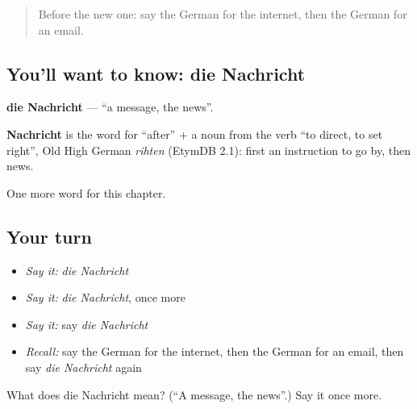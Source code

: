 \label{lesson:GE-C159-nachricht}



\begin{quote}
Before the new one: say the German for the internet, then the German for an email.
\end{quote}

\subsection*{You'll want to know: die Nachricht}
\textbf{die Nachricht} — \textquotedblleft{}a message, the news\textquotedblright{}.

\begin{cousinweb}
\textbf{Nachricht} is the word for \textquotedblleft{}after\textquotedblright{} + a noun from the verb \textquotedblleft{}to direct, to set right\textquotedblright{}, Old High German \emph{rihten} (EtymDB 2.1): first an instruction to go by, then news.
\end{cousinweb}

\begin{grammarlens}[title={What you've built}]
One more word for this chapter.
\end{grammarlens}

\subsection*{Your turn}
\begin{itemize}
\raggedright
  \item \emph{Say it:} \emph{die Nachricht}
  \item \emph{Say it:} \emph{die Nachricht}, once more
  \item \emph{Say it:} say \emph{die Nachricht}
  \item \emph{Recall:} say the German for the internet, then the German for an email, then say \emph{die Nachricht} again
\end{itemize}

\begin{tcolorbox}[breakable,colback=teal!4,colframe=teal!35!black,title={Before you move on}]
What does die Nachricht mean? (\textquotedblleft{}A message, the news\textquotedblright{}.) Say it once more.
\end{tcolorbox}
